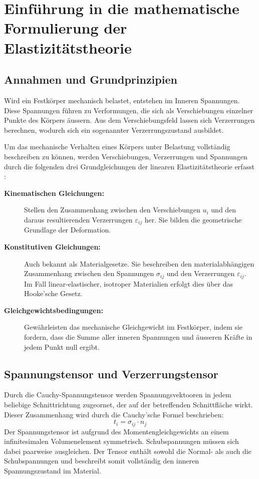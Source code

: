 %
%
%
%
\section{Einführung in die mathematische Formulierung der Elastizitätstheorie}
\label{elastomechanik:section:teil2}
\subsection{Annahmen und Grundprinzipien}
Wird ein Festkörper mechanisch belastet, entstehen im Inneren Spannungen. Diese Spannungen führen zu Verformungen, die sich als Verschiebungen einzelner Punkte des Körpers äussern.
Aus dem Verschiebungsfeld lassen sich Verzerrungen berechnen, wodurch sich ein sogenannter Verzerrungszustand ausbildet.

Um das mechanische Verhalten eines Körpers unter Belastung vollständig beschreiben zu können, werden Verschiebungen, Verzerrungen und Spannungen durch die folgenden drei Grundgleichungen der linearen Elastizitätstheorie erfasst \cite{elastomechanik:Technische Mechanik 2:Elastostatik}:

\begin{description}
	\item [\textbf{Kinematischen Gleichungen:}] Stellen den Zusammenhang zwischen den Verschiebungen $u_i$ und den daraus resultierenden Verzerrungen $\varepsilon_{ij}$ her. 
	Sie bilden die geometrische Grundlage der Deformation.
	
	\item [\textbf{Konstitutiven Gleichungen:}] Auch bekannt als Materialgesetze. 
	Sie beschreiben den materialabhängigen Zusammenhang zwischen den Spannungen $\sigma_{ij}$ und den Verzerrungen $\varepsilon_{ij}$. 
	Im Fall linear-elastischer, isotroper Materialien erfolgt dies über das Hooke’sche Gesetz.
	
	\item [\textbf{Gleichgewichtsbedingungen:}] Gewährleisten das mechanische Gleichgewicht im Festkörper, indem sie fordern, dass die Summe aller inneren Spannungen und äusseren Kräfte in jedem Punkt null ergibt.
\end{description}

\subsection{Spannungstensor und Verzerrungstensor}
Durch die Cauchy-Spannungstensor werden Spannungsvektooren in jedem beliebige Schnittrichtung zugeornet, der auf der betreffenden Schnittfläche wirkt.
Dieser Zusammenhang wird durch die Cauchy’sche Formel beschrieben:
	\begin{equation}
		t_i = 
		\sigma_{ij} \cdot n_j
	\end{equation}
Der Spannungstensor ist aufgrund des Momentengleichgewichts an einem infinitesimalen Volumenelement symmetrisch. Schubspannungen müssen sich dabei paarweise ausgleichen. 
Der Tensor enthält sowohl die Normal- als auch die Schubspannungen und beschreibt somit vollständig den inneren Spannungszustand im Material.

